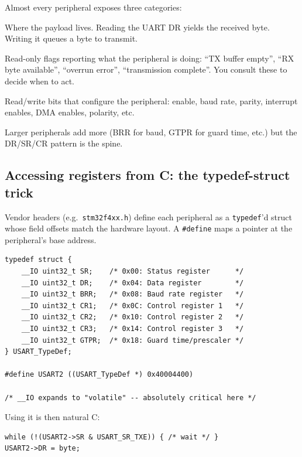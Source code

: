 \documentclass[11pt,a4paper]{article}
\begin{document}
Almost every peripheral exposes three categories:

\begin{description}[leftmargin=*, style=nextline]
    \item[Data register (DR).] Where the payload lives. Reading the UART
    DR yields the received byte. Writing it queues a byte to transmit.
    \item[Status register (SR).] Read-only flags reporting what the
    peripheral is doing: ``TX buffer empty'', ``RX byte available'',
    ``overrun error'', ``transmission complete''. You consult these to
    decide when to act.
    \item[Control register (CR).] Read/write bits that configure the
    peripheral: enable, baud rate, parity, interrupt enables, DMA enables,
    polarity, etc.
\end{description}

Larger peripherals add more (BRR for baud, GTPR for guard time, etc.) but
the DR/SR/CR pattern is the spine.

\subsection{Accessing registers from C: the typedef-struct trick}

Vendor headers (e.g.\ \texttt{stm32f4xx.h}) define each peripheral as a
\texttt{typedef}'d struct whose field offsets match the hardware layout.
A \texttt{\#define} maps a pointer at the peripheral's base address.

\begin{lstlisting}[style=C, caption={Simplified USART definition}]
typedef struct {
    __IO uint32_t SR;    /* 0x00: Status register      */
    __IO uint32_t DR;    /* 0x04: Data register        */
    __IO uint32_t BRR;   /* 0x08: Baud rate register   */
    __IO uint32_t CR1;   /* 0x0C: Control register 1   */
    __IO uint32_t CR2;   /* 0x10: Control register 2   */
    __IO uint32_t CR3;   /* 0x14: Control register 3   */
    __IO uint32_t GTPR;  /* 0x18: Guard time/prescaler */
} USART_TypeDef;

#define USART2 ((USART_TypeDef *) 0x40004400)

/* __IO expands to "volatile" -- absolutely critical here */
\end{lstlisting}

Using it is then natural C:
\begin{lstlisting}[style=C]
while (!(USART2->SR & USART_SR_TXE)) { /* wait */ }
USART2->DR = byte;
\end{lstlisting}
\end{document}
